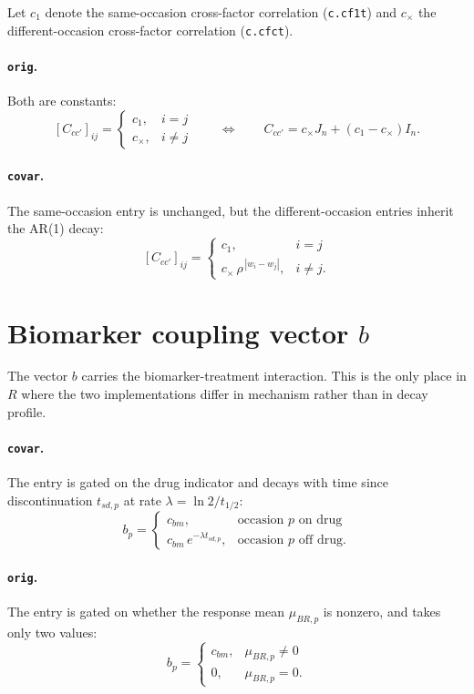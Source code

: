 \documentclass[11pt]{article}
\begin{document}
Let $c_1$ denote the same-occasion cross-factor correlation
(\texttt{c.cf1t}) and $c_{\times}$ the different-occasion cross-factor
correlation (\texttt{c.cfct}).

\paragraph{\texttt{orig}.} Both are constants:
\[
[C_{cc'}]_{ij} =
\begin{cases}
c_1, & i = j\\
c_{\times}, & i \neq j
\end{cases}
\qquad\Longleftrightarrow\qquad
C_{cc'} = c_{\times} J_n + (c_1 - c_{\times}) I_n .
\]

\paragraph{\texttt{covar}.} The same-occasion entry is unchanged, but
the different-occasion entries inherit the AR(1) decay:
\[
[C_{cc'}]_{ij} =
\begin{cases}
c_1, & i = j\\
c_{\times}\,\rho^{\,|w_i - w_j|}, & i \neq j .
\end{cases}
\]

\section{Biomarker coupling vector $b$}

The vector $b$ carries the biomarker-treatment interaction. This is
the only place in $R$ where the two implementations differ in
mechanism rather than in decay profile.

\paragraph{\texttt{covar}.} The entry is gated on the drug indicator
and decays with time since discontinuation $t_{sd,p}$ at rate
$\lambda = \ln 2 / t_{1/2}$:
\[
b_p =
\begin{cases}
c_{bm}, & \text{occasion } p \text{ on drug}\\
c_{bm}\,e^{-\lambda t_{sd,p}}, & \text{occasion } p \text{ off drug} .
\end{cases}
\]

\paragraph{\texttt{orig}.} The entry is gated on whether the response
mean $\mu_{BR,p}$ is nonzero, and takes only two values:
\[
b_p =
\begin{cases}
c_{bm}, & \mu_{BR,p} \neq 0\\
0, & \mu_{BR,p} = 0 .
\end{cases}
\]
\end{document}
